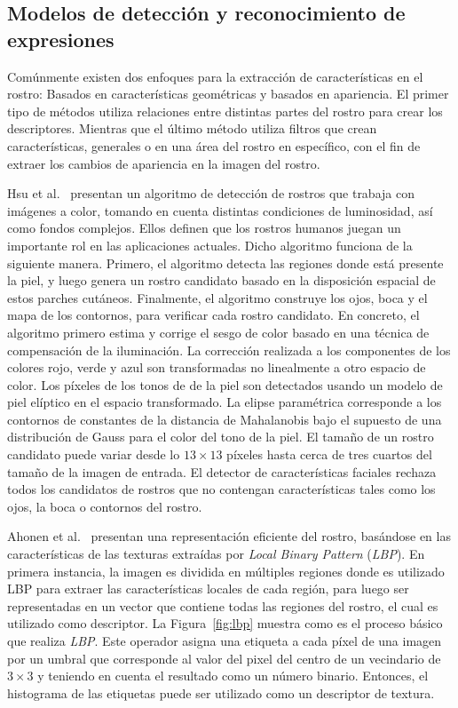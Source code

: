 \subsection{Modelos de detección y reconocimiento de expresiones}\label{subsec:expre}
Comúnmente existen dos enfoques para la extracción de características en el rostro: Basados en características geométricas y basados en apariencia. El primer tipo de métodos utiliza relaciones entre distintas partes del rostro para crear los descriptores. Mientras que el último método utiliza filtros que crean características, generales o en una área del rostro en específico, con el fin de extraer los cambios de apariencia en la imagen del rostro.

Hsu et al.~\cite{Hsu2002} presentan un algoritmo de detección de rostros que trabaja con imágenes a color, tomando en cuenta distintas condiciones de luminosidad, así como fondos complejos. Ellos definen que los rostros humanos juegan un importante rol en las aplicaciones actuales. Dicho algoritmo funciona de la siguiente manera. Primero, el algoritmo detecta las regiones donde está presente la piel, y luego genera un rostro candidato basado en la disposición espacial de estos parches cutáneos. Finalmente, el algoritmo construye los ojos, boca y el mapa de los contornos, para verificar cada rostro candidato. En concreto, el algoritmo primero estima y corrige el sesgo de color basado en una técnica de compensación de la iluminación. La corrección realizada a los componentes de los colores rojo, verde y azul son transformadas no linealmente a otro espacio de color. Los píxeles de los tonos de de la piel son detectados usando un modelo de piel elíptico en el espacio transformado. La elipse paramétrica corresponde a los contornos de constantes de la distancia de Mahalanobis bajo el supuesto de una distribución de Gauss para el color del tono de la piel. El tamaño de un rostro candidato puede variar desde lo $13 \times 13$ píxeles hasta cerca de tres cuartos del tamaño de la imagen de entrada. El detector de características faciales rechaza todos los candidatos de rostros que no contengan características tales como los ojos, la boca o contornos del rostro.

Ahonen et al.~\cite{ahonen2006} presentan una representación eficiente del rostro, basándose en las características de las texturas extraídas por \textit{Local Binary Pattern} (\textit{LBP}). En primera instancia, la imagen es dividida en múltiples regiones donde es utilizado LBP para extraer las características locales de cada región, para luego ser representadas en un vector que contiene todas las regiones del rostro, el cual es utilizado como descriptor. La Figura~\ref{fig:lbp} muestra como es el proceso básico que realiza \textit{LBP}. Este operador asigna una etiqueta a cada píxel de una imagen por un umbral que corresponde al valor del pixel del centro de un vecindario de $3 \times 3$ y teniendo en cuenta el resultado como un número binario. Entonces, el histograma de las etiquetas puede ser utilizado como un descriptor de textura.

